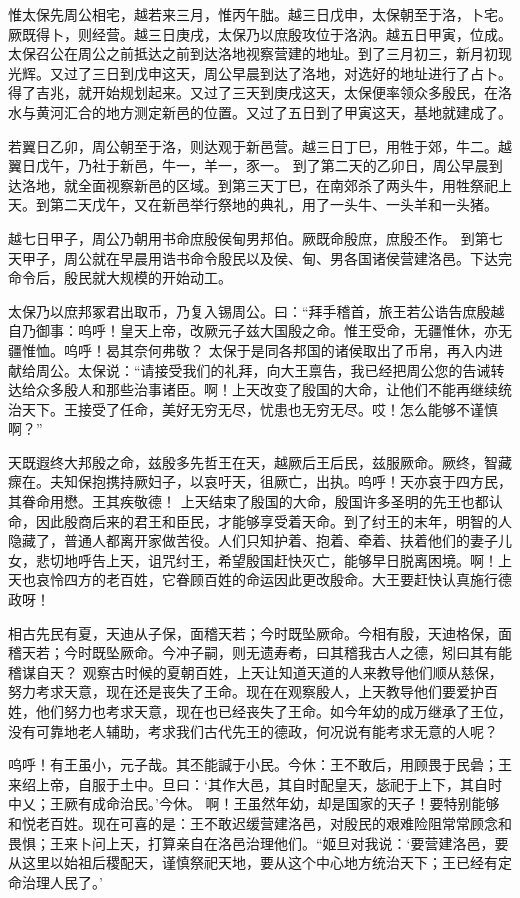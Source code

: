 \documentclass[a4paper,12pt,UTF8,twoside]{ctexbook}
\begin{document}
惟太保先周公相宅，越若来三月，惟丙午朏。越三日戊申，太保朝至于洛，卜宅。厥既得卜，则经营。越三日庚戌，太保乃以庶殷攻位于洛汭。越五日甲寅，位成。
太保召公在周公之前抵达之前到达洛地视察营建的地址。到了三月初三，新月初现光辉。又过了三日到戊申这天，周公早晨到达了洛地，对选好的地址进行了占卜。得了吉兆，就开始规划起来。又过了三天到庚戌这天，太保便率领众多殷民，在洛水与黄河汇合的地方测定新邑的位置。又过了五日到了甲寅这天，基地就建成了。

若翼日乙卯，周公朝至于洛，则达观于新邑营。越三日丁巳，用牲于郊，牛二。越翼日戊午，乃社于新邑，牛一，羊一，豕一。
到了第二天的乙卯日，周公早晨到达洛地，就全面视察新邑的区域。到第三天丁巳，在南郊杀了两头牛，用牲祭祀上天。到第二天戊午，又在新邑举行祭地的典礼，用了一头牛、一头羊和一头猪。

越七日甲子，周公乃朝用书命庶殷侯甸男邦伯。厥既命殷庶，庶殷丕作。
到第七天甲子，周公就在早晨用诰书命令殷民以及侯、甸、男各国诸侯营建洛邑。下达完命令后，殷民就大规模的开始动工。

太保乃以庶邦冢君出取币，乃复入锡周公。曰：“拜手稽首，旅王若公诰告庶殷越自乃御事：呜呼！皇天上帝，改厥元子兹大国殷之命。惟王受命，无疆惟休，亦无疆惟恤。呜呼！曷其奈何弗敬？
太保于是同各邦国的诸侯取出了币帛，再入内进献给周公。太保说：“请接受我们的礼拜，向大王禀告，我已经把周公您的告诫转达给众多殷人和那些治事诸臣。啊！上天改变了殷国的大命，让他们不能再继续统治天下。王接受了任命，美好无穷无尽，忧患也无穷无尽。哎！怎么能够不谨慎啊？”

天既遐终大邦殷之命，兹殷多先哲王在天，越厥后王后民，兹服厥命。厥终，智藏瘝在。夫知保抱携持厥妇子，以哀吁天，徂厥亡，出执。呜呼！天亦哀于四方民，其眷命用懋。王其疾敬德！
上天结束了殷国的大命，殷国许多圣明的先王也都认命，因此殷商后来的君王和臣民，才能够享受着天命。到了纣王的末年，明智的人隐藏了，普通人都离开家做苦役。人们只知护着、抱着、牵着、扶着他们的妻子儿女，悲切地呼告上天，诅咒纣王，希望殷国赶快灭亡，能够早日脱离困境。啊！上天也哀怜四方的老百姓，它眷顾百姓的命运因此更改殷命。大王要赶快认真施行德政呀！

相古先民有夏，天迪从子保，面稽天若；今时既坠厥命。今相有殷，天迪格保，面稽天若；今时既坠厥命。今冲子嗣，则无遗寿耇，曰其稽我古人之德，矧曰其有能稽谋自天？
观察古时候的夏朝百姓，上天让知道天道的人来教导他们顺从慈保，努力考求天意，现在还是丧失了王命。现在在观察殷人，上天教导他们要爱护百姓，他们努力也考求天意，现在也已经丧失了王命。如今年幼的成万继承了王位，没有可靠地老人辅助，考求我们古代先王的德政，何况说有能考求无意的人呢？

呜呼！有王虽小，元子哉。其丕能諴于小民。今休：王不敢后，用顾畏于民碞；王来绍上帝，自服于土中。旦曰：‘其作大邑，其自时配皇天，毖祀于上下，其自时中乂；王厥有成命治民。’今休。
啊！王虽然年幼，却是国家的天子！要特别能够和悦老百姓。现在可喜的是：王不敢迟缓营建洛邑，对殷民的艰难险阻常常顾念和畏惧；王来卜问上天，打算亲自在洛邑治理他们。“姬旦对我说：‘要营建洛邑，要从这里以始祖后稷配天，谨慎祭祀天地，要从这个中心地方统治天下；王已经有定命治理人民了。’
\end{document}
